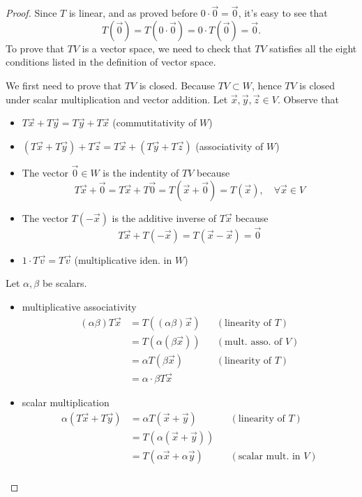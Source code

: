 \begin{proof}
  Since $T$ is linear, and as proved before $0\cdot\vec{0}=\vec{0}$, 
  it's easy to see that 
  $$T(\vec{0})=T(0\cdot\vec{0})=0\cdot T(\vec{0})=\vec{0}.$$
  To prove that $TV$ is a vector space, we need to check that $TV$ satisfies
  all the eight conditions listed in the definition of vector space.

  We first need to prove that $TV$ is closed.
  Because $TV\subset W$, hence $TV$ is closed under scalar multiplication and
  vector addition. Let $\vec{x},\vec{y},\vec{z}\in V$. Observe that
  \begin{itemize}
    \item $T\vec{x}+T\vec{y}=T\vec{y}+T\vec{x}$
      \quad (commutitativity of $W$)
    \item $(T\vec{x}+T\vec{y})+T\vec{z}=T\vec{x}+(T\vec{y}+T\vec{z})$
      \quad (associativity of $W$)
    \item The vector $\vec{0}\in W$ is the indentity of $TV$ because 
      \[
        T\vec{x}+\vec{0}=T\vec{x}+T\vec{0}=T(\vec{x}+\vec{0})=T(\vec{x}),\quad 
        \forall \vec{x}\in V
      \]
    \item The vector $T(-\vec{x})$ is the additive inverse of $T\vec{x}$ because
      \[T\vec{x}+T(-\vec{x})=T(\vec{x}-\vec{x})=\vec{0}\]
    \item $1\cdot T\vec{v}=T\vec{v}$
      \quad (multiplicative iden. in $W$)
  \end{itemize}
  Let $\alpha, \beta$ be scalars.
  \begin{itemize}
    \item multiplicative associativity
      \begin{align*}
        (\alpha\beta)T\vec{x} 
        &= T((\alpha\beta)\vec{x})
        && (\text{linearity of $T$})\\
        &= T(\alpha (\beta\vec{x})) 
        && (\text{mult. asso. of $V$})\\
        &= \alpha T(\beta\vec{x})
        && (\text{linearity of $T$})\\
        &= \alpha\cdot\beta T\vec{x}
      \end{align*}
    \item scalar multiplication
      \begin{align*}
        \alpha(T\vec{x}+T\vec{y})
        &=\alpha T(\vec{x}+\vec{y}) && (\text{linearity of $T$})\\
        &=T(\alpha(\vec{x}+\vec{y})) \\
        &=T(\alpha\vec{x}+\alpha\vec{y}) && (\text{scalar mult. in $V$})\\

\end{align*}
\end{itemize}
\end{proof}
